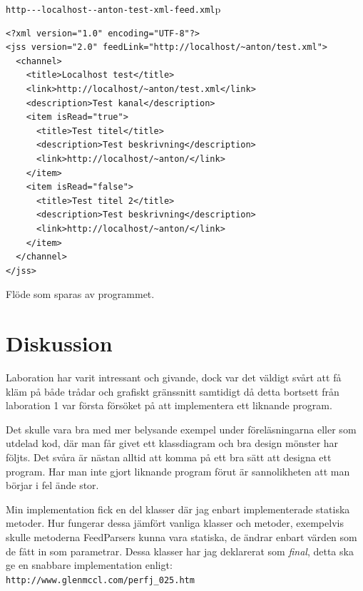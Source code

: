 \documentclass[titlepage, twoside, a4paper, 12pt]{article}
\begin{document}
\verb!http---localhost--anton-test-xml-feed.xml!p

\begin{program}
\begin{footnotesize}
\begin{verbatim}
<?xml version="1.0" encoding="UTF-8"?>
<jss version="2.0" feedLink="http://localhost/~anton/test.xml">
  <channel>
    <title>Localhost test</title>
    <link>http://localhost/~anton/test.xml</link>
    <description>Test kanal</description>
    <item isRead="true">
      <title>Test titel</title>
      <description>Test beskrivning</description>
      <link>http://localhost/~anton/</link>
    </item>
    <item isRead="false">
      <title>Test titel 2</title>
      <description>Test beskrivning</description>
      <link>http://localhost/~anton/</link>
    </item>
  </channel>
</jss>
\end{verbatim}
\end{footnotesize}
\caption{Flöde som sparas av programmet.}
\label{verb:jss-xml}
\end{program}

\section{Diskussion}\label{Diskussion}
Laboration har varit intressant och givande, dock var det väldigt
svårt att få kläm på både trådar och grafiskt gränssnitt samtidigt då
detta bortsett från laboration 1 var första försöket på att
implementera ett liknande program.

Det skulle vara bra med mer belysande exempel under föreläsningarna
eller som utdelad kod, där man får givet ett klassdiagram och bra
design mönster har följts. Det svåra är nästan alltid att komma på ett
bra sätt att designa ett program. Har man inte gjort liknande program
förut är sannolikheten att man börjar i fel ände stor.

Min implementation fick en del klasser där jag enbart implementerade
statiska metoder. Hur fungerar dessa jämfört vanliga klasser och
metoder, exempelvis skulle metoderna FeedParsers kunna vara statiska,
de ändrar enbart värden som de fått in som parametrar. Dessa klasser
har jag deklarerat som \textit{final}, detta ska ge en snabbare
implementation enligt:\\
\verb!http://www.glenmccl.com/perfj_025.htm!\\


\newpage
\appendix
{}
\end{document}
